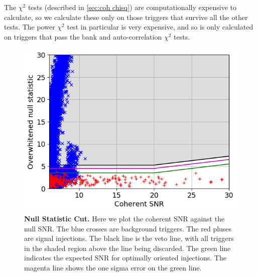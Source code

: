 \documentclass[11pt]{cuthesis}
\begin{document}
The $\chi^2$ tests (described in \ref{sec:coh chisq}) are computationally expensive to calculate, so we calculate these only on those triggers that survive all the other tests. The power $\chi^2$ test in particular is very expensive, and so is only calculated on triggers that pass the bank and auto-correlation $\chi^2$ tests.

\begin{figure} %
\begin{center}
\includegraphics[width=0.8\linewidth]{GRB170817A_null_stat2_vs_snr_zoom.png}
\end{center}
\caption{\textbf{Null Statistic Cut.} Here we plot the coherent SNR against the null SNR. The blue crosses are background triggers. The red pluses are signal injections. The black line is the veto line, with all triggers in the shaded region above the line being discarded. The green line indicates the expected SNR for optimally oriented injections. The magenta line shows the one sigma error on the green line. }
\label{fig:nullcut}
\end{figure}
\end{document}
